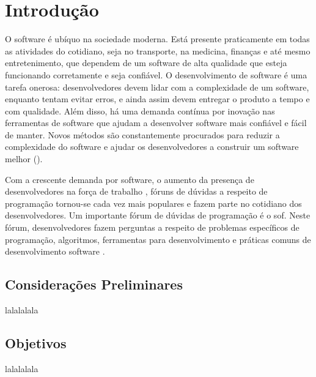 \chapter{Introdução}
\label{cap:introducao}

O software é ubíquo na sociedade moderna. Está presente praticamente em todas as atividades do cotidiano, seja no transporte, na medicina, finanças e até mesmo entretenimento, que dependem de um software de alta qualidade que esteja funcionando corretamente e seja confiável. O desenvolvimento de software é uma tarefa onerosa: desenvolvedores devem lidar com a complexidade de um software, enquanto tentam evitar erros, e ainda assim devem entregar o produto a tempo e com qualidade. Além disso, há uma demanda contínua por inovação nas ferramentas de software que ajudam a desenvolver software mais confiável e fácil de manter. Novos métodos são constantemente procurados para reduzir a complexidade do software e ajudar os desenvolvedores a construir um software melhor (\cite{Allamanis:2018:SML}).

Com a crescente demanda por software, o aumento da presença de desenvolvedores na força de trabalho \cite{wikipedia-developers-demographics-2019}, fóruns de dúvidas a respeito de programação tornou-se cada vez mais populares e fazem parte no cotidiano dos desenvolvedores. Um importante fórum de dúvidas de programação é o \Gls{sof}. Neste fórum, desenvolvedores fazem perguntas a respeito de problemas específicos de programação, algoritmos, ferramentas para desenvolvimento e práticas comuns de desenvolvimento software \cite{stackoverflow-questions-topics-2019}. 





\section{Considerações Preliminares}
\label{sec:consideracoes_preliminares}

lalalalala


\section{Objetivos}
\label{sec:objetivo}

lalalalala

